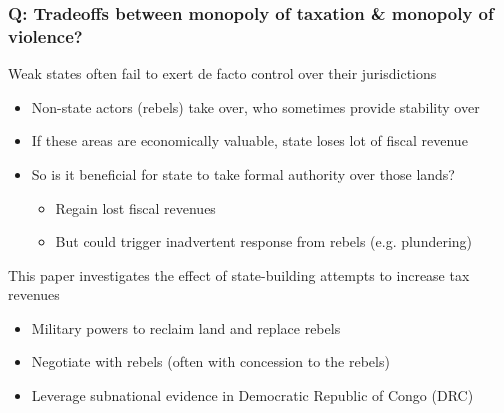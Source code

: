 \documentclass[aspectratio=169]{beamer}
\begin{document}
\begin{frame}
\frametitle{Q: Tradeoffs between monopoly of taxation \& monopoly of violence?} 
Weak states often fail to exert de facto control over their jurisdictions
\begin{itemize}\setlength\itemsep{3pt}
\item Non-state actors (rebels) take over, who sometimes provide stability over 
\item If these areas are economically valuable, state loses lot of fiscal revenue
\item So is it beneficial for state to take formal authority over those lands?
\begin{itemize}\setlength\itemsep{3pt}
\item Regain lost fiscal revenues
\item But could trigger inadvertent response from rebels (e.g. plundering)
\end{itemize}
\end{itemize}\medskip
This paper investigates the effect of state-building attempts to increase tax revenues
\begin{itemize}\setlength\itemsep{3pt}
\item Military powers to reclaim land and replace rebels
\item Negotiate with rebels (often with concession to the rebels)
\item Leverage subnational evidence in Democratic Republic of Congo (DRC) 
\end{itemize}
\end{frame}
\end{document}
